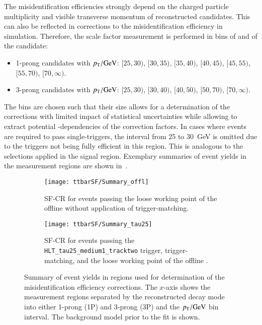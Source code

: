 The \jettotauhadvis misidentification efficiencies strongly depend on the
charged particle multiplicity and visible transverse momentum of reconstructed
\tauhadvis candidates. This can also be reflected in corrections to the
\jettotauhadvis misidentification efficiency in simulation. Therefore, the scale
factor measurement is performed in bins of \Ntracks and \pT of the \tauhadvis
candidate:
\begin{itemize}

\item 1-prong \tauhadvis candidates with $\pT / \si{\GeV}$: $[25, 30)$,
  $[30, 35)$, $[35, 40)$, $[40, 45)$, $[45, 55)$, $[55, 70)$, $[70, \infty)$.

\item 3-prong \tauhadvis candidates with $\pT / \si{\GeV}$: $[25, 30)$,
  $[30, 40)$, $[40, 50)$, $[50, 70)$, $[70, \infty)$.

\end{itemize}
The bins are chosen such that their size allows for a determination of the
corrections with limited impact of statistical uncertainties while allowing to
extract potential \pT-dependencies of the correction factors. In cases where
events are required to pass single-\tauhadvis triggers, the \tauhadvis \pT
interval from 25 to \SI{30}{\GeV} is omitted due to the triggers not being fully
efficient in this region. This is analogous to the selections applied in the
\hadhad signal region. Exemplary summaries of event yields in the measurement
regions are shown in~.

\begin{figure}[htbp]
  \centering

  \begin{subfigure}[t]{.485\textwidth}
    \texttt{[image: ttbarSF/Summary\_offl]}
    \caption{SF-CR for events passing the loose working point of the offline
      \tauid without application of trigger-matching.}
  \end{subfigure}\hfill%
  \begin{subfigure}[t]{.485\textwidth}
    \texttt{[image: ttbarSF/Summary\_tau25]}
    \caption{SF-CR for events passing the \texttt{HLT\_tau25\_medium1\_tracktwo}
      trigger, trigger-matching, and the loose working point of the offline
      \tauid.}
  \end{subfigure}

  \caption{Summary of event yields in regions used for determination
    of the \jettotauhadvis misidentification efficiency
    corrections. The $x$-axis shows the measurement regions separated
    by the reconstructed decay mode into either 1-prong (1P) and
    3-prong (3P) \tauhadvis and the \tauhadvis $\pT /\si{\GeV}$ bin
    interval. The background model prior to the fit is shown.}%
  \label{fig:ttbarsf_region_summary_prefit}
\end{figure}

